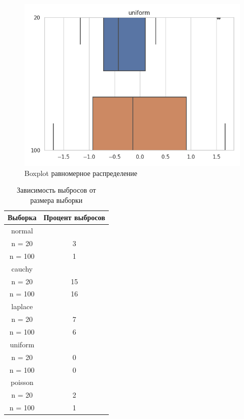 \documentclass[12pt]{article}
\begin{document}
\begin{center}
\begin{figure}[H]
 \caption{Boxplot равномерное распределение }
\includegraphics[scale = 0.7]{uniform.png}
\end{figure}

\begin{table}[H]
\caption{Зависимость выбросов от размера выборки}
\label{tab:my_label2}
\begin{center}
\vspace{5mm}
\begin{tabular}{|c|c|}
\hline
Выборка & Процент выбросов\\
\hline
normal&\\
\hline
n = 20    &3    \\
\hline
n = 100   &1    \\
\hline
cauchy&\\
\hline
n = 20    &15    \\
\hline
n = 100   &16    \\
\hline
laplace&\\
\hline
n = 20    &7    \\
\hline
n = 100   &6    \\
\hline
uniform &\\
\hline
n = 20    &0   \\
\hline
n = 100   &0    \\
\hline
poisson &
\\
\hline
n = 20    &2    \\
\hline
n = 100   &1    \\
\hline

\end{tabular}
\end{center}
\end{table}
\end{center}
\end{document}
